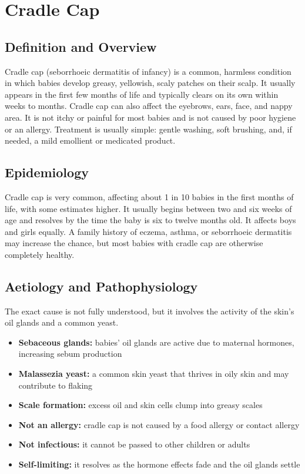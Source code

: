 \chapter{Cradle Cap}

\section*{Definition and Overview}
Cradle cap (seborrhoeic dermatitis of infancy) is a common, harmless condition in which babies develop greasy, yellowish, scaly patches on their scalp. It usually appears in the first few months of life and typically clears on its own within weeks to months. Cradle cap can also affect the eyebrows, ears, face, and nappy area. It is not itchy or painful for most babies and is not caused by poor hygiene or an allergy. Treatment is usually simple: gentle washing, soft brushing, and, if needed, a mild emollient or medicated product.

\section*{Epidemiology}
Cradle cap is very common, affecting about 1 in 10 babies in the first months of life, with some estimates higher. It usually begins between two and six weeks of age and resolves by the time the baby is six to twelve months old. It affects boys and girls equally. A family history of eczema, asthma, or seborrhoeic dermatitis may increase the chance, but most babies with cradle cap are otherwise completely healthy.

\section*{Aetiology and Pathophysiology}
The exact cause is not fully understood, but it involves the activity of the skin's oil glands and a common yeast.

\begin{itemize}
    \item \textbf{Sebaceous glands:} babies' oil glands are active due to maternal hormones, increasing sebum production
    \item \textbf{Malassezia yeast:} a common skin yeast that thrives in oily skin and may contribute to flaking
    \item \textbf{Scale formation:} excess oil and skin cells clump into greasy scales
    \item \textbf{Not an allergy:} cradle cap is not caused by a food allergy or contact allergy
    \item \textbf{Not infectious:} it cannot be passed to other children or adults
    \item \textbf{Self-limiting:} it resolves as the hormone effects fade and the oil glands settle
\end{itemize}

